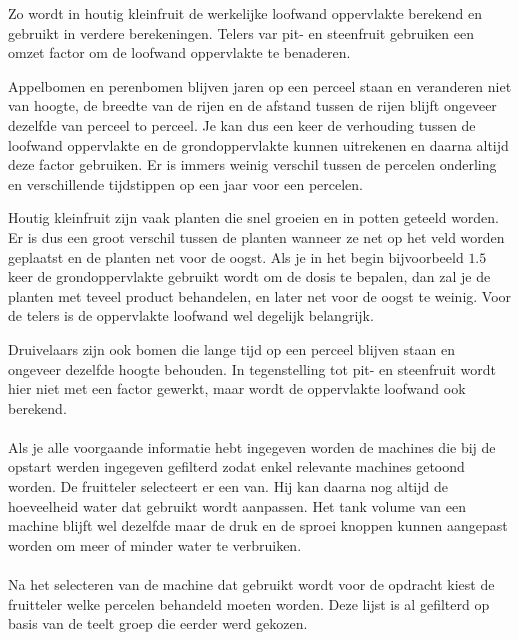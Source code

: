 Zo wordt in houtig kleinfruit de werkelijke loofwand oppervlakte berekend en gebruikt in
verdere berekeningen. Telers var pit- en steenfruit gebruiken een omzet factor om de
loofwand oppervlakte te benaderen.

Appelbomen en perenbomen blijven jaren op een perceel staan en veranderen niet van hoogte,
de breedte van de rijen en de afstand tussen de rijen blijft ongeveer dezelfde van perceel
to perceel. Je kan dus een keer de verhouding tussen de loofwand oppervlakte en de
grondoppervlakte kunnen uitrekenen en daarna altijd deze factor gebruiken. Er is immers
weinig verschil tussen de percelen onderling en verschillende tijdstippen op een jaar voor
een percelen.

Houtig kleinfruit zijn vaak planten die snel groeien en in potten geteeld worden.  Er is
dus een groot verschil tussen de planten wanneer ze net op het veld worden geplaatst en de
planten net voor de oogst. Als je in het begin bijvoorbeeld $1.5$ keer de grondoppervlakte
gebruikt wordt om de dosis te bepalen, dan zal je de planten met teveel product
behandelen, en later net voor de oogst te weinig. Voor de telers is de oppervlakte
loofwand wel degelijk belangrijk.

Druivelaars zijn ook bomen die lange tijd op een perceel blijven staan en ongeveer
dezelfde hoogte behouden. In tegenstelling tot pit- en steenfruit wordt hier niet met een
factor gewerkt, maar wordt de oppervlakte loofwand ook berekend.

\paragraph {} Als je alle voorgaande informatie hebt ingegeven worden de machines die bij
de opstart werden ingegeven gefilterd zodat enkel relevante machines getoond worden. De
fruitteler selecteert er een van. Hij kan daarna nog altijd de hoeveelheid water dat
gebruikt wordt aanpassen. Het tank volume van een machine blijft wel dezelfde maar de druk
en de sproei knoppen kunnen aangepast worden om meer of minder water te verbruiken.

\paragraph {} Na het selecteren van de machine dat gebruikt wordt voor de opdracht kiest
de fruitteler welke percelen behandeld moeten worden. Deze lijst is al gefilterd op basis
van de teelt groep die eerder werd gekozen.

